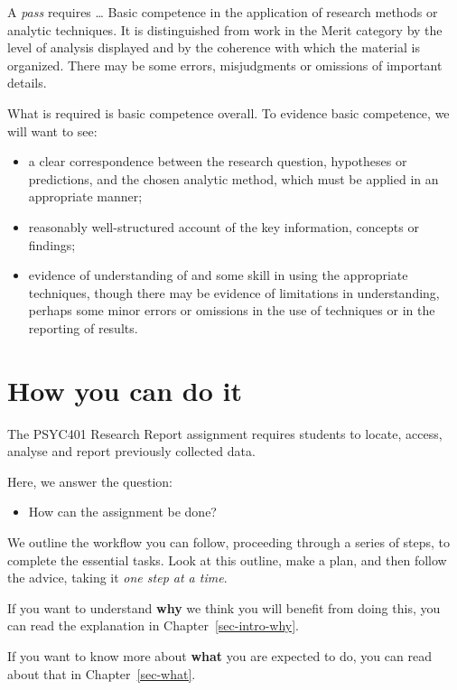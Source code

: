 \documentclass[
  letterpaper,
  DIV=11,
  numbers=noendperiod]{scrreprt}
\providecommand{\tightlist}{%
  \setlength{\itemsep}{0pt}\setlength{\parskip}{0pt}}\usepackage{longtable,booktabs,array}
\begin{document}
A \emph{pass} requires \ldots{} Basic competence in the application of
research methods or analytic techniques. It is distinguished from work
in the Merit category by the level of analysis displayed and by the
coherence with which the material is organized. There may be some
errors, misjudgments or omissions of important details.

What is required is basic competence overall. To evidence basic
competence, we will want to see:

\begin{itemize}
\tightlist
\item
  a clear correspondence between the research question, hypotheses or
  predictions, and the chosen analytic method, which must be applied in
  an appropriate manner;
\item
  reasonably well-structured account of the key information, concepts or
  findings;
\item
  evidence of understanding of and some skill in using the appropriate
  techniques, though there may be evidence of limitations in
  understanding, perhaps some minor errors or omissions in the use of
  techniques or in the reporting of results.
\end{itemize}


\hypertarget{sec-how}{%
\chapter{How you can do it}\label{sec-how}}

The PSYC401 Research Report assignment requires students to locate,
access, analyse and report previously collected data.

Here, we answer the question:

\begin{itemize}
\tightlist
\item
  How can the assignment be done?
\end{itemize}

We outline the workflow you can follow, proceeding through a series of
steps, to complete the essential tasks. Look at this outline, make a
plan, and then follow the advice, taking it \emph{one step at a time}.

If you want to understand \textbf{why} we think you will benefit from
doing this, you can read the explanation in Chapter~\ref{sec-intro-why}.

If you want to know more about \textbf{what} you are expected to do, you
can read about that in Chapter~\ref{sec-what}.
\end{document}
